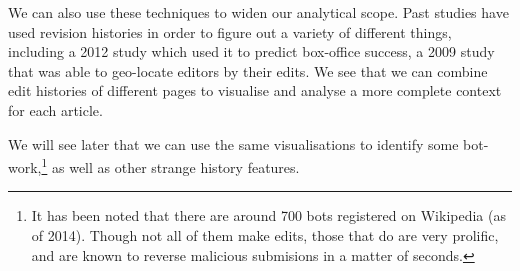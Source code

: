 We can also use these techniques to widen our analytical scope. Past
studies have used revision histories in order to figure out a variety
of different things, including a 2012 study which used it to predict
box-office success,\cite{Mestyan2012} a 2009 study that was able to
geo-locate editors by their edits.\cite{Lieberman2009} We see that we
can combine edit histories of different pages to visualise and analyse
a more complete context for each article.

We will see later that we can use the same visualisations to identify
some bot-work,\footnote{It has been noted that there are around 700
  bots registered on Wikipedia (as of 2014). Though not all of them
  make edits, those that do are very prolific, and are known to
  reverse malicious submisions in a matter of
  seconds.\cite{wiki-bots}\cite{bbc-bots}} as well as other strange
history features.




